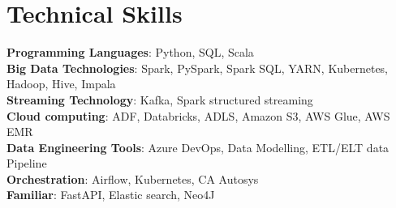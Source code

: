 \documentclass[letterpaper,11pt]{article}
\begin{document}
\section{Technical Skills}
 \begin{itemize}[leftmargin=0.15in, label={}]
    \small{\item{
     \textbf{Programming Languages}{:\hspace{0.06cm}  Python, SQL, Scala} \\
     \textbf{Big Data Technologies}{:\hspace{0.49cm}     Spark, PySpark, Spark SQL, YARN, Kubernetes, Hadoop, Hive, Impala } \\
     \textbf{Streaming Technology}{:\hspace{0.51cm} Kafka, Spark structured streaming} \\
     \textbf{Cloud computing}{:\hspace{1.38cm} ADF, Databricks, ADLS, Amazon S3, AWS Glue, AWS EMR } \\
     \textbf{Data Engineering Tools}{:\hspace{0.28cm} Azure DevOps, Data Modelling, ETL/ELT data Pipeline}\\
     \textbf{Orchestration}{:\hspace{2.02cm} Airflow, Kubernetes, CA Autosys} \\
     \textbf{Familiar}{:\hspace{3cm} FastAPI, Elastic search, Neo4J} \\
     
     
    }}
 \end{itemize}

\end{document}

